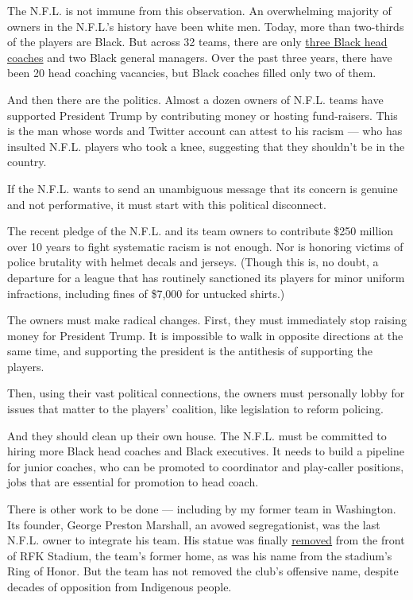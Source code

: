 The N.F.L. is not immune from this observation. An overwhelming majority
of owners in the N.F.L.'s history have been white men. Today, more than
two-thirds of the players are Black. But across 32 teams, there are only
\href{https://www.espn.com/nfl/story/_/id/29354971/nfl-quarterback-coach-summit-urges-owners-look-deeper-minority-hires}{three
Black head coaches} and two Black general managers. Over the past three
years, there have been 20 head coaching vacancies, but Black coaches
filled only two of them.

And then there are the politics. Almost a dozen owners of N.F.L. teams
have supported President Trump by contributing money or hosting
fund-raisers. This is the man whose words and Twitter account can attest
to his racism --- who has insulted N.F.L. players who took a knee,
suggesting that they shouldn't be in the country.

If the N.F.L. wants to send an unambiguous message that its concern is
genuine and not performative, it must start with this political
disconnect.

The recent pledge of the N.F.L. and its team owners to contribute \$250
million over 10 years to fight systematic racism is not enough. Nor is
honoring victims of police brutality with helmet decals and jerseys.
(Though this is, no doubt, a departure for a league that has routinely
sanctioned its players for minor uniform infractions, including fines of
\$7,000 for untucked shirts.)

The owners must make radical changes. First, they must immediately stop
raising money for President Trump. It is impossible to walk in opposite
directions at the same time, and supporting the president is the
antithesis of supporting the players.

Then, using their vast political connections, the owners must personally
lobby for issues that matter to the players' coalition, like legislation
to reform policing.

And they should clean up their own house. The N.F.L. must be committed
to hiring more Black head coaches and Black executives. It needs to
build a pipeline for junior coaches, who can be promoted to coordinator
and play-caller positions, jobs that are essential for promotion to head
coach.

There is other work to be done --- including by my former team in
Washington. Its founder, George Preston Marshall, an avowed
segregationist, was the last N.F.L. owner to integrate his team. His
statue was finally
\href{https://www.nfl.com/news/george-preston-marshall-statue-removed-at-rfk-stadium}{removed}
from the front of RFK Stadium, the team's former home, as was his name
from the stadium's Ring of Honor. But the team has not removed the
club's offensive name, despite decades of opposition from Indigenous
people.

